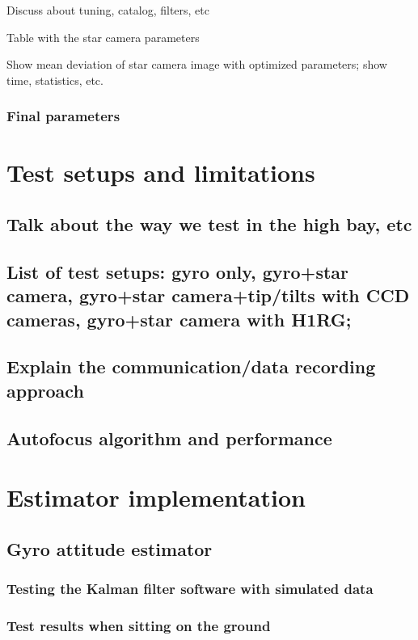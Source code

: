 Discuss about tuning, catalog, filters, etc

Table with the star camera parameters

Show mean deviation of star camera image with optimized parameters;
show time, statistics, etc.

\subsubsection{Final parameters}

\section{Test setups and limitations}
\subsection{Talk about the way we test in the high bay, etc}
\subsection{List of test setups: gyro only, gyro+star camera, gyro+star camera+tip/tilts with CCD cameras, gyro+star camera with H1RG;}
\subsection{Explain the communication/data recording approach}

\subsection{Autofocus algorithm and performance}

\section{Estimator implementation}
\subsection{Gyro attitude estimator}


\subsubsection{Testing the Kalman filter software with simulated data}
\subsubsection{Test results when sitting on the ground}
